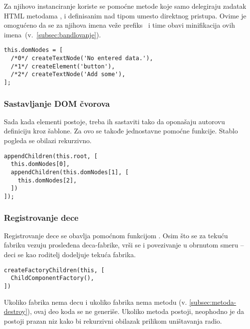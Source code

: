 Za njihovo instanciranje koriste se pomoćne metode koje samo delegiraju zadatak HTML metodama ,  i  definisanim nad tipom  umesto direktnog pristupa.
Ovime je omogućeno da se za njihova imena veže prefiks~ i time obavi minifikacija ovih imena~(v.~\cref{subsec:bandlovanje}).

\begin{lstlisting}
this.domNodes = [
  /*0*/ createTextNode('No entered data.'),
  /*1*/ createElement('button'),
  /*2*/ createTextNode('Add some'),
];
\end{lstlisting}

\subsubsection{Sastavljanje DOM čvorova}
\label{subsubsec:init-part-5}

Sada kada elementi postoje, treba ih sastaviti tako da oponašaju autorovu definiciju kroz šablone.
Za ovo se takođe jednostavne pomoćne funkcije.
Stablo pogleda se obilazi rekurzivno.

\begin{lstlisting}
appendChildren(this.root, [
  this.domNodes[0],
  appendChildren(this.domNodes[1], [
    this.domNodes[2],
  ])
]);
\end{lstlisting}

\subsubsection{Registrovanje dece}
\label{subsubsec:registrovanje-dece}
\label{subsubsec:init-part-6}

Registrovanje dece se obavlja pomoćnom funkcijom .
Osim što se za tekuću fabriku vezuju prosleđena deca-fabrike, vrši se i povezivanje u obrnutom smeru -- deci se kao roditelj dodeljuje tekuća fabrika.

\begin{lstlisting}
createFactoryChildren(this, [
  ChildComponentFactory(),
])
\end{lstlisting}

Ukoliko fabrika nema decu i ukoliko fabrika nema  metodu (v. \cref{subsec:metoda-destroy}), ovaj deo koda se ne generiše.
Ukoliko metoda  postoji, neophodno je da postoji prazan niz  kako bi rekurzivni obilazak prilikom uništavanja radio.


